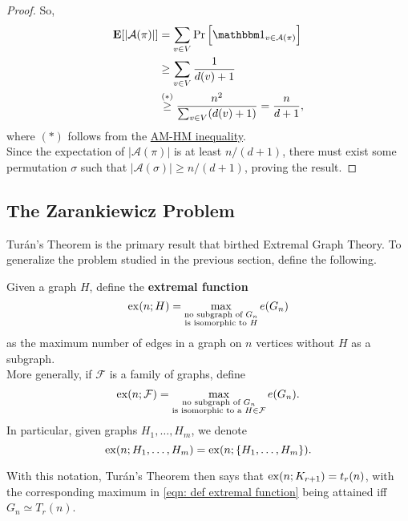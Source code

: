 \begin{proof}
			So,
			\begin{align*}
				\expec[ |\mathcal{A}(\pi)| ] &= \sum_{v \in V} \Pr\left[ \indic_{v \in \mathcal{A}(\pi)} \right] \\
				&\ge \sum_{v \in V} \frac{1}{d(v) + 1} \\
				&\stackrel{(*)}{\ge} \frac{n^2}{\sum_{v \in V} (d(v) + 1)} = \frac{n}{d+1},
			\end{align*}
			where $(*)$ follows from the \href{https://en.wikipedia.org/wiki/HM-GM-AM-QM_inequalities}{AM-HM inequality}.\\
			Since the expectation of $|\mathcal{A}(\pi)|$ is at least $n/(d+1)$, there must exist some permutation $\sigma$ such that $|\mathcal{A}(\sigma)| \ge n/(d+1)$, proving the result.
		\end{proof}

	\subsection{The Zarankiewicz Problem}

		Tur\'{a}n's Theorem is the primary result that birthed Extremal Graph Theory. To generalize the problem studied in the previous section, define the following.

		\begin{fdef}
			Given a graph $H$, define the \textbf{extremal function}
			\begin{equation}
				\label{eqn: def extremal function}
				\operatorname{ex}(n;H) = \max_{\substack{\text{no subgraph of }G_n \\\text{is isomorphic to }H}} e(G_n)
			\end{equation}
			as the maximum number of edges in a graph on $n$ vertices without $H$ as a subgraph.\\
			More generally, if $\mathcal{F}$ is a family of graphs, define
			\[ \operatorname{ex}(n;\mathcal{F}) = \max_{\substack{\text{no subgraph of }G_n \\\text{is isomorphic to a }H\in\mathcal{F}}} e(G_n). \]
			In particular, given graphs $H_1,\ldots,H_m$, we denote
			\[ \operatorname{ex}(n;H_1,\ldots,H_m) = \operatorname{ex}(n;\{H_1,\ldots,H_m\}). \]	
		\end{fdef}

		With this notation, Tur\'{a}n's Theorem then says that $\operatorname{ex}(n;K_{r+1}) = t_r(n)$, with the corresponding maximum in \eqref{eqn: def extremal function} being attained iff $G_n \simeq T_r(n)$.

